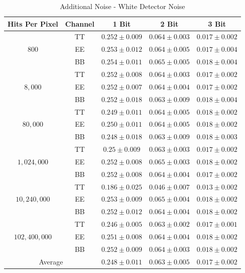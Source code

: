 \documentclass[apj]{emulateapj}
\begin{document}
\def\arraystretch{1.3}
\begin{table}[tbh]
\begin{center}
\caption{\label{tab:extranoisewhite} Additional Noise - White Detector Noise}
\small
\begin{tabular}{c c c c c}
Hits Per Pixel & Channel & 1 Bit & 2 Bit & 3 Bit \\
\hline
\hline
\multirow{3}{*}{$800$}  & TT  & $ 0.252 \pm 0.009 $  & $ 0.064 \pm 0.003 $  & $ 0.017 \pm 0.002 $ \\
& EE  & $ 0.253 \pm 0.012 $  & $ 0.064 \pm 0.005 $  & $ 0.017 \pm 0.004 $ \\
& BB  & $ 0.254 \pm 0.011 $  & $ 0.065 \pm 0.005 $  & $ 0.018 \pm 0.004 $ \\
\hline
\multirow{3}{*}{$8,000$}  & TT  & $ 0.252 \pm 0.008 $  & $ 0.064 \pm 0.003 $  & $ 0.017 \pm 0.002 $ \\
& EE  & $ 0.252 \pm 0.007 $  & $ 0.064 \pm 0.004 $  & $ 0.017 \pm 0.002 $ \\
& BB  & $ 0.252 \pm 0.018 $  & $ 0.063 \pm 0.009 $  & $ 0.018 \pm 0.004 $ \\
\hline
\multirow{3}{*}{$80,000$}  & TT  & $ 0.249 \pm 0.011 $  & $ 0.064 \pm 0.005 $  & $ 0.018 \pm 0.002 $ \\
& EE  & $ 0.250 \pm 0.011 $  & $ 0.064 \pm 0.005 $  & $ 0.018 \pm 0.002 $ \\
& BB  & $ 0.248 \pm 0.018 $  & $ 0.063 \pm 0.009 $  & $ 0.018 \pm 0.003 $ \\
\hline
\multirow{3}{*}{$1,024,000$}  & TT  & $ 0.25 \pm 0.009 $  & $ 0.063 \pm 0.003 $  & $ 0.017 \pm 0.002 $ \\
& EE  & $ 0.252 \pm 0.008 $  & $ 0.065 \pm 0.003 $  & $ 0.018 \pm 0.002 $ \\
& BB  & $ 0.252 \pm 0.008 $  & $ 0.064 \pm 0.004 $  & $ 0.017 \pm 0.002 $ \\
\hline
\multirow{3}{*}{$10,240,000$}  & TT  & $ 0.186 \pm 0.025 $  & $ 0.046 \pm 0.007 $  & $ 0.013 \pm 0.002 $ \\
& EE  & $ 0.253 \pm 0.009 $  & $ 0.065 \pm 0.004 $  & $ 0.018 \pm 0.002 $ \\
& BB  & $ 0.252 \pm 0.012 $  & $ 0.064 \pm 0.004 $  & $ 0.018 \pm 0.002 $ \\
\hline
\multirow{3}{*}{$102,400,000$}  & TT  & $ 0.246 \pm 0.005 $  & $ 0.063 \pm 0.002 $  & $ 0.017 \pm 0.001 $ \\
& EE  & $ 0.251 \pm 0.008 $  & $ 0.064 \pm 0.004 $  & $ 0.018 \pm 0.002 $ \\
& BB  & $ 0.252 \pm 0.009 $  & $ 0.064 \pm 0.003 $  & $ 0.018 \pm 0.002 $ \\
\hline
\multicolumn{2}{c}{Average}  & $ 0.248 \pm 0.011 $  & $ 0.063 \pm 0.005 $  & $ 0.017 \pm 0.002 $ \\
\end{tabular}
 \normalsize
\end{center}
\end{table}
\end{document}
